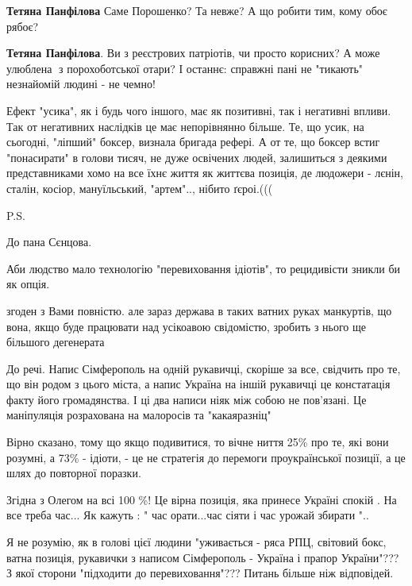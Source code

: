 \begin{itemize}
\begin{itemize} %
\textbf{Тетяна Панфілова} Саме Порошенко? Та невже?
А що робити тим, кому обоє рябоє?

\textbf{Тетяна Панфілова}. Ви з реєстрових патріотів, чи просто корисних? А може улюблена 🐑з порохоботської отари?
І останнє: справжні пані не "тикають" незнайомій людині - не чемно!
\end{itemize} %


Ефект "усика", як і будь чого іншого, має як позитивні, так і негативні впливи.
Так от негативних наслідків це має непорівнянно більше. Те, що усик, на
сьогодні, "ліпший" боксер, визнала бригада рефері. А от те, що боксер встиг
"понасирати" в голови тисяч, не дуже освічених людей, залишиться з деякими
представниками хомо на все їхнє життя як життєва позиція, де людожери - лєнін,
сталін, косіор, мануїльський, "артем".., нібито ґєроі.(((

P.S.

До пана Сєнцова.

Аби людство мало технологію "перевиховання ідіотів", то рецидивісти зникли би як опція.



згоден з Вами повністю. але зараз держава в таких ватних руках манкуртів, що
вона, якщо буде працювати над усікоавою свідомістю, зробить з нього ще більшого
дегенерата


До речі. Напис Сімферополь на одній рукавичці, скоріше за все, свідчить про те,
що він родом з цього міста, а напис Україна на іншій рукавичці це констатація
факту його громадянства. І ці два написи ніяк між собою не пов'язані. Це
маніпуляція розрахована на малоросів та "какаяразніц"



Вірно сказано, тому що якщо подивитися, то вічне ниття 25\% про те, які вони
розумні, а 73\% - ідіоти, - це не стратегія до перемоги проукраїнської позиції,
а це шлях до повторної поразки.



Згідна з Олегом на всі 100 \%! Це вірна позиція, яка принесе Україні спокій . На
все треба час... Як кажуть : " час орати...час сіяти і час урожай збирати "..

Я не розумію, як в голові цієї людини "уживається - ряса РПЦ, світовий бокс, ватна позиція, рукавички з написом Сімферополь - Україна і прапор України"???
З якої сторони "підходити до перевиховання"???
Питань більше ніж відповідей.


\end{itemize}
